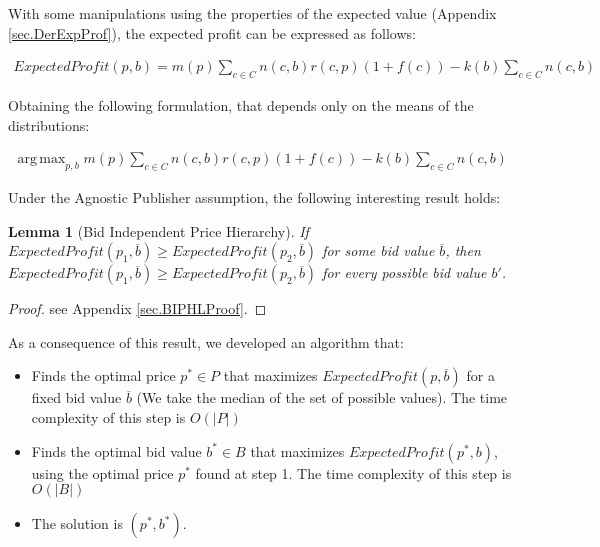 \documentclass[11pt]{article} %
\DeclareMathOperator*{\argmax}{arg\,max}
\newtheorem*{lemma}{Lemma}
\begin{document}
With some manipulations using the properties of the expected value (Appendix \ref{sec.DerExpProf}), the expected profit can be expressed as follows:

\begin{align*}
ExpectedProfit(p,b)=m(p)\sum_{c \in C}{n(c,b)r(c,p)(1+f(c))}-k(b)\sum_{c \in C}{n(c,b)}
\end{align*}

Obtaining the following formulation, that depends only on the means of the distributions:

\begin{align*}
\argmax_{p,b}{m(p)\sum_{c \in C}{n(c,b)r(c,p)(1+f(c))}-k(b)\sum_{c \in C}{n(c,b)}}
\end{align*}

Under the Agnostic Publisher assumption, the following interesting result holds:

\begin{lemma}[Bid Independent Price Hierarchy]
If $ExpectedProfit(p_1,\overline b) \ge ExpectedProfit(p_2,\overline b)$ for some bid value $\overline b$,  then $ExpectedProfit(p_1,\overline b) \ge ExpectedProfit(p_2,\overline b)$  for every possible bid value $b'$.
\end{lemma}
\begin{proof}
see Appendix \ref{sec.BIPHLProof}.
\end{proof}

As a consequence of this result, we developed an algorithm that:
\begin{itemize}
\item Finds the optimal price $p^*\in P$ that maximizes $ExpectedProfit(p,\overline b)$ for a fixed bid value $\overline b$ (We take the median of the set of possible values). The time complexity of this step is $O(|P|)$
\item Finds the optimal bid value $b^* \in B$ that maximizes $ExpectedProfit(p^*, b)$, using the optimal price $p^*$ found at step 1. The time complexity of this step is $O(|B|)$
\item The solution is $(p^*, b^*)$.
\end{itemize}
\end{document}
